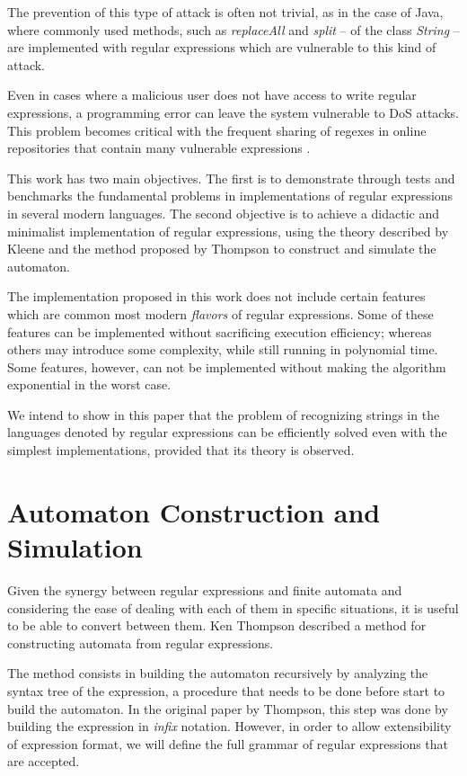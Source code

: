 \documentclass{llncs}
\begin{document}
The prevention of this type of attack is often not trivial, as in the case of Java, where commonly used methods, such as \emph{replaceAll} and \emph{split} -- of the class \emph{String} -- are implemented with regular expressions which are vulnerable to this kind of attack. 

Even in cases where a malicious user does not have access to write regular expressions, a programming error can leave the system vulnerable to DoS attacks. This problem becomes critical with the frequent sharing of regexes in online repositories that contain many vulnerable expressions \cite{bib:Kirrage13,bib:Weidman10}. 

This work has two main objectives. The first is to demonstrate through tests and benchmarks the fundamental problems in implementations of regular expressions in several modern languages. The second objective is to achieve a didactic and minimalist implementation of regular expressions, using the theory described by Kleene and the method proposed by Thompson to construct and simulate the automaton.

The implementation proposed in this work does not include certain features which are common most modern \emph{flavors} of regular expressions. Some of these features can be implemented without sacrificing execution efficiency; whereas others may introduce some complexity, while still running in polynomial time. Some features, however, can not be implemented without making the algorithm exponential in the worst case.

We intend to show in this paper that the problem of recognizing strings in the languages denoted by regular expressions can be efficiently solved even with the simplest implementations, provided that its theory is observed.

\section{Automaton Construction and Simulation}

Given the synergy between regular expressions and finite automata and considering the ease of dealing with each of them in specific situations, it is useful to be able to convert between them. Ken Thompson \cite{bib:Thompson68} described a method for constructing automata from regular expressions. 

The method consists in building the automaton recursively by analyzing the syntax tree of the expression, a procedure that needs to be done before start to build the automaton. In the original paper by Thompson, this step was done by building the expression in \emph{infix} notation. However, in order to allow extensibility of expression format, we will define the full grammar of regular expressions that are accepted.
\end{document}
